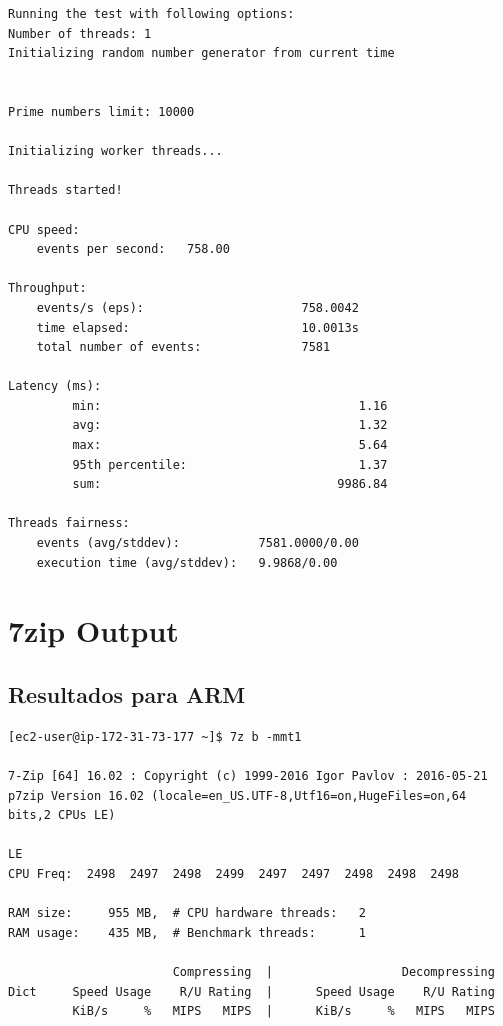 \documentclass[a4paper,openright,12pt]{article}
\begin{document}
\begin{appendices}
\begin{verbatim}
Running the test with following options:
Number of threads: 1
Initializing random number generator from current time


Prime numbers limit: 10000

Initializing worker threads...

Threads started!

CPU speed:
    events per second:   758.00

Throughput:
    events/s (eps):                      758.0042
    time elapsed:                        10.0013s
    total number of events:              7581

Latency (ms):
         min:                                    1.16
         avg:                                    1.32
         max:                                    5.64
         95th percentile:                        1.37
         sum:                                 9986.84

Threads fairness:
    events (avg/stddev):           7581.0000/0.00
    execution time (avg/stddev):   9.9868/0.00
\end{verbatim}


\newpage
\section{7zip Output}\label{anexo:7zip_output}
\subsection{Resultados para ARM}
\begin{verbatim}
[ec2-user@ip-172-31-73-177 ~]$ 7z b -mmt1

7-Zip [64] 16.02 : Copyright (c) 1999-2016 Igor Pavlov : 2016-05-21
p7zip Version 16.02 (locale=en_US.UTF-8,Utf16=on,HugeFiles=on,64 bits,2 CPUs LE)

LE
CPU Freq:  2498  2497  2498  2499  2497  2497  2498  2498  2498

RAM size:     955 MB,  # CPU hardware threads:   2
RAM usage:    435 MB,  # Benchmark threads:      1

                       Compressing  |                  Decompressing
Dict     Speed Usage    R/U Rating  |      Speed Usage    R/U Rating
         KiB/s     %   MIPS   MIPS  |      KiB/s     %   MIPS   MIPS


\end{verbatim}
\end{appendices}
\end{document}
